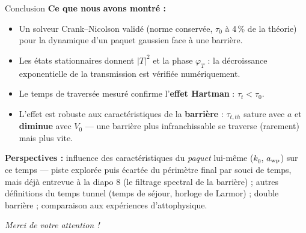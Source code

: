 \documentclass[10pt,aspectratio=169]{beamer}
\begin{document}
\begin{frame}{Conclusion}
  \textbf{Ce que nous avons montré :}
  \begin{itemize}
    \item Un solveur Crank--Nicolson validé (norme conservée, $\tau_0$ à 4\,\%
          de la théorie) pour la dynamique d'un paquet gaussien face à une
          barrière.
    \item Les états stationnaires donnent $|T|^2$ et la phase $\varphi_T$ :
          la décroissance exponentielle de la transmission est vérifiée
          numériquement.
    \item Le temps de traversée mesuré confirme l'\textbf{effet Hartman} :
          $\tau_t < \tau_0$.
    \item L'effet est robuste aux caractéristiques de la \textbf{barrière} :
          $\tau_{t,th}$ sature avec $a$ et \textbf{diminue} avec $V_0$ —
          une barrière plus infranchissable se traverse (rarement) mais
          plus vite.
  \end{itemize}
  \vspace{0.5em}
  \textbf{Perspectives :} influence des caractéristiques du \emph{paquet}
  lui-même ($k_0$, $a_{\rm wp}$) sur ce temps — piste explorée puis écartée
  du périmètre final par souci de temps, mais déjà entrevue à la diapo 8
  (le filtrage spectral de la barrière) ; autres définitions du temps
  tunnel (temps de séjour, horloge de Larmor) ; double barrière ;
  comparaison aux expériences d'attophysique.
  \vspace{0.8em}
  \begin{center}
    \emph{Merci de votre attention !}
  \end{center}
\end{frame}
\end{document}
